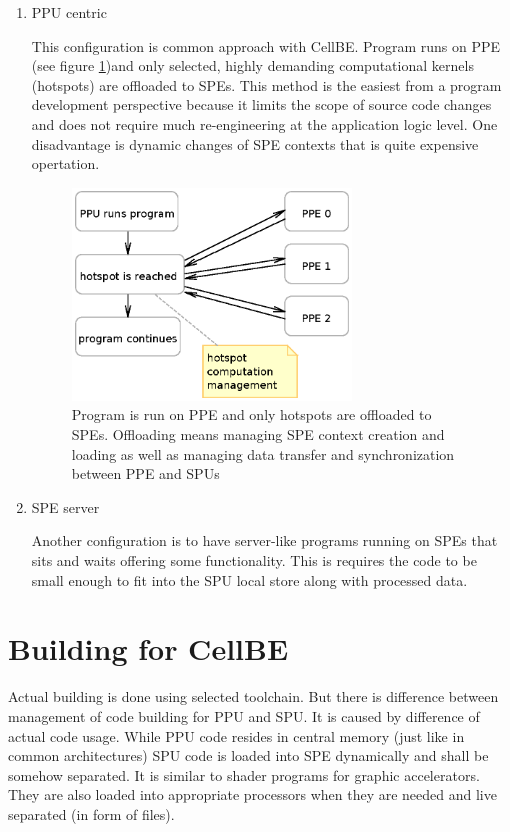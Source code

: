 \begin{enumerate}
\item PPU centric
\par
This configuration is common approach with CellBE.
Program runs on PPE (see figure \ref{fg:PPUCentricModel})and only selected, highly demanding computational kernels (hotspots) are offloaded to SPEs.
This method is the easiest from a program development perspective because it limits the scope of source code changes and does not require much re-engineering at the application logic level.
One disadvantage is dynamic changes of SPE contexts that is quite expensive opertation.

\begin{figure}
    \centering
    \includegraphics[width=0.7\textwidth]{data/PPUCentricModel}
    \caption[PPU centric configuration]{Program is run on PPE and only hotspots are offloaded to SPEs.
 Offloading means managing SPE context creation and loading as well as managing data transfer and synchronization between PPE and SPUs}
    \label{fg:PPUCentricModel}
\end{figure}

\item SPE server
\par
Another configuration is to have server-like programs running on SPEs that sits and waits offering some functionality.
 This is requires the code to be small enough to fit into the SPU local store along with processed data.

\end{enumerate}

\section {Building for CellBE}
\par
Actual building is done using selected toolchain.
 But there is difference between management of code building for PPU and SPU.
 It is caused by difference of actual code usage.
While PPU code resides in central memory (just like in common architectures) SPU code is loaded into SPE dynamically and shall be somehow separated.
 It is similar to shader programs for graphic accelerators.
They are also loaded into appropriate processors when they are needed and live separated (in form of files).

